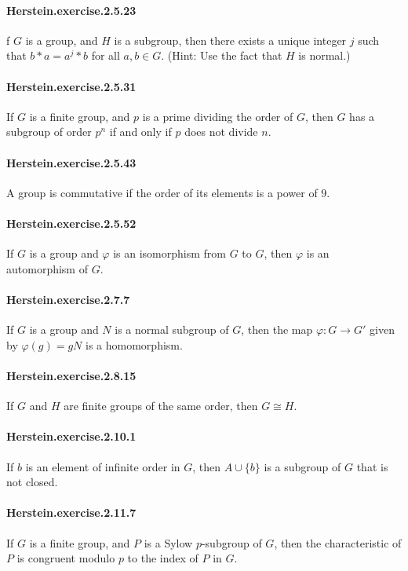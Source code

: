 \documentclass{article}
\begin{document}
\paragraph{Herstein.exercise.2.5.23} f $G$ is a group, and $H$ is a subgroup, then there exists a unique integer $j$ such that $b*a = a^j * b$ for all $a, b \in G$. (Hint: Use the fact that $H$ is normal.)

\paragraph{Herstein.exercise.2.5.31} If $G$ is a finite group, and $p$ is a prime dividing the order of $G$, then $G$ has a subgroup of order $p^n$ if and only if $p$ does not divide $n$.

\paragraph{Herstein.exercise.2.5.43} A group is commutative if the order of its elements is a power of $9$.

\paragraph{Herstein.exercise.2.5.52} If $G$ is a group and $φ$ is an isomorphism from $G$ to $G$, then $φ$ is an automorphism of $G$.

\paragraph{Herstein.exercise.2.7.7} If $G$ is a group and $N$ is a normal subgroup of $G$, then the map $\varphi : G \to G'$ given by $\varphi(g) = gN$ is a homomorphism.

\paragraph{Herstein.exercise.2.8.15} If $G$ and $H$ are finite groups of the same order, then $G \cong H$.

\paragraph{Herstein.exercise.2.10.1} If $b$ is an element of infinite order in $G$, then $A \cup \{b\}$ is a subgroup of $G$ that is not closed.

\paragraph{Herstein.exercise.2.11.7} If $G$ is a finite group, and $P$ is a Sylow $p$-subgroup of $G$, then the characteristic of $P$ is congruent modulo $p$ to the index of $P$ in $G$.
\end{document}
